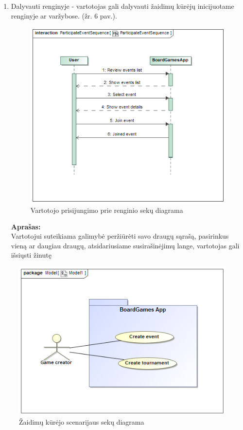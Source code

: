 \documentclass{VUMIFPSkursinis}
\begin{document}
\begin{enumerate}
			\item Dalyvauti renginyje - vartotojas gali dalyvauti žaidimų kūrėjų 
			inicijuotame renginyje ar varžybose. (žr. 6 pav.).
				\begin{figure}[H]
					\centering
					\includegraphics[scale=0.5]{img/ParticipateEventSequence}
					\caption{Vartotojo prisijungimo prie renginio sekų diagrama}
					\label{img:ParticipateEventSequence}
				\end{figure}
				\textbf{Aprašas:}\\
					Vartotojui suteikiama galimybė peržiūrėti savo draugų sąrašą, 
					pasirinkus vieną ar daugiau draugų, atsidariusiame 
					susirašinėjimų lange, vartotojas gali išsiųsti žinutę					
			\end{enumerate}	

			\begin{figure}[H]
				\centering
				\includegraphics[scale=0.5]{img/CreatorUseCase}
				\caption{Žaidimų kūrėjo scenarijaus sekų diagrama}
				\label{img:CreatorUseCase}
			\end{figure}
			
\end{document}

